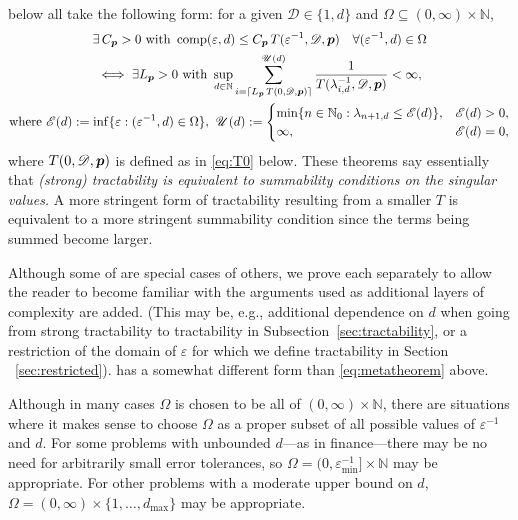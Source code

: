 \documentclass[sort&compress]{elsarticle}
\newcommand{\thed}{\mathscr{D}}
\newcommand{\theM}{\mathscr{E}}
\newcommand{\theUB}{\mathscr{U}}
\begin{document}
 below all take the following form:  for a given $\thed \in \{1,d\}$ and $\Omega \subseteq (0,\infty) \times \mathbb{N}$,
\begin{multline} \label{eq:metatheorem}
  \exists \,C_{\vp} > 0 \text{ with }
    \comp(\varepsilon, d) \le  C_{\vp}\, T(\varepsilon^{-1},\thed,\vp) \quad \forall (\varepsilon^{-1},d) \in \Omega \\
    \iff   \exists L_{\vp} >0 \text{ with }
    \sup_{d \in \naturals}
     \sum_{i = \lceil L_{\vp}\, T(0,\thed,\vp) \rceil}^{\theUB(d)} \frac{1}{T(\lambda^{-1}_{i,d},\thed,\vp)}< \infty, \\
     \text{where } \theM(d) := \inf \{\varepsilon : (\varepsilon^{-1},d) \in \Omega \}, \
     \theUB(d) := \begin{cases}
        \min\{n \in \natzero : \lambda_{n+1,d} \le \theM(d) \}, &   \theM(d) > 0, \\
        \infty, & \theM(d) = 0,
        \end{cases}
\end{multline}
where $T(0,\thed,\vp)$ is defined as in \eqref{eq:T0} below. These theorems say essentially that \emph{(strong) tractability is equivalent to summability conditions on the singular values.} A more stringent form of tractability resulting from a smaller $T$ is equivalent to a more stringent summability condition since the terms being summed become larger.

Although some of  are special cases of others, we prove each separately to allow the reader to become familiar with the arguments used as additional layers of complexity are added. (This may be, e.g., additional
dependence on $d$ when going from strong tractability to tractability in Subsection~\ref{sec:tractability}, or a restriction of the domain of $\varepsilon$ for which we define tractability in Section 
~\ref{sec:restricted}).  \Cref{thm:subhT} has a somewhat different form than \eqref{eq:metatheorem} above.  

Although in many cases $\Omega$ is chosen to be all of $(0,\infty) \times \mathbb{N}$, there are situations where it makes sense to choose $\Omega$ as a proper subset of all possible values of $\varepsilon^{-1}$ and $d$.  For some problems with unbounded $d$---as in finance---there may be no need for arbitrarily small error tolerances, so $\Omega = (0,\varepsilon_{\min}^{-1}] \times \mathbb{N}$ may be appropriate.  For other problems with a moderate upper bound on $d$, $\Omega = (0,\infty) \times \{1, \ldots, d_{\max}\}$ may be appropriate.
\end{document}
